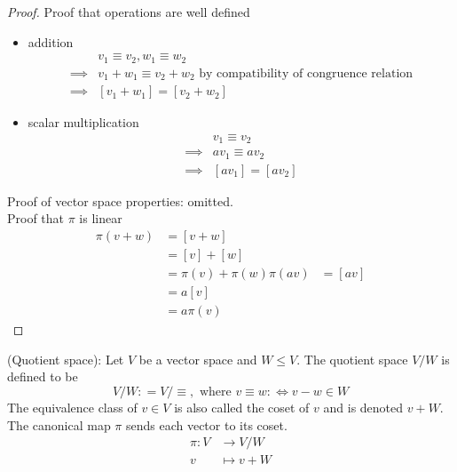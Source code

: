 \begin{proof}
    Proof that operations are well defined 
    \begin{itemize}
        \item addition
        \begin{align*}
            & v_1 \equiv v_2, w_1 \equiv w_2 \\
            \implies & v_1 + w_1 \equiv v_2 + w_2 \text{ by compatibility of congruence relation} \\
            \implies & \left[ v_1 + w_1 \right] = \left[ v_2 + w_2 \right] 
        \end{align*}
        \item scalar multiplication
        \begin{align*}
            & v_1 \equiv v_2 \\
            \implies & av_1 \equiv av_2 \\
            \implies & [av_1] = [av_2]
        \end{align*}
    \end{itemize} 

    Proof of vector space properties: omitted. \\

    Proof that $\pi$ is linear 
    \begin{align*}
        \pi(v + w) &= \left[ v + w \right]  \\
        &= \left[ v \right]  + \left[ w \right]  \\
        &= \pi(v) + \pi(w)
        \pi(av) &= \left[ av \right]  \\
        &= a \left[ v \right]  \\
        &= a \pi(v)
    \end{align*}
\end{proof}

\begin{definition}
    (Quotient space): Let $V$ be a vector space and $W \leq V$. The quotient space $V / W$ is defined to be 
    \[
        V / W : = V / \equiv , \text{ where } v \equiv w : \iff v -w \in W
    \]
    The equivalence class of $v \in V$ is also called the coset of $v$ and is denoted $v + W$.  \\

    The canonical map $\pi$ sends each vector to its coset. \\
    \begin{align*}
        \pi: V & \to V / W \\
        v & \mapsto v + W
    \end{align*}
\end{definition}

